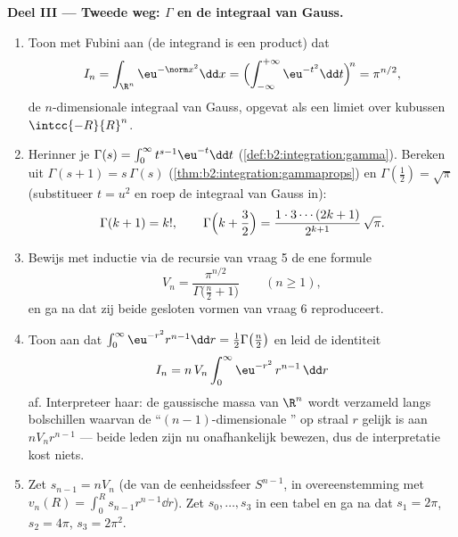\begin{problem}[{Weekendopgave --- $V_n =
\pi^{n/2}/\Gamma(\frac n2 + 1)$, en de vreemdheid van hoge
dimensies}]
\medskip
\noindent\textbf{Deel III --- Tweede weg: $\Gamma$ en de
integraal van Gauss.}
\begin{enumerate}[resume]
  \item Toon met Fubini aan (de integrand is een product) dat
        \[
        I_n = \int_{\R^n}\eu^{-\norm
        x^2}\dd x
        = \Bigl(\int_{-\infty}^{+\infty}
        \eu^{-t^2}\dd t\Bigr)^{\!n} = \pi^{n/2},
        \]
        de $n$-dimensionale integraal van Gauss, opgevat als een
        limiet over kubussen $\intcc{-R}{R}^n$.
  \item Herinner je $\Gamma(s) = \int_0^\infty t^{s-1}\eu^{-t}\dd
        t$ (\cref{def:b2:integration:gamma}). Bereken uit
        $\Gamma(s+1) = s\,\Gamma(s)$
        (\cref{thm:b2:integration:gammaprops}) en
        $\Gamma(\tfrac12) = \sqrt\pi$ (substitueer $t = u^2$ en
        roep de integraal van Gauss in):
        \[
        \Gamma(k + 1) = k!,
        \qquad
        \Gamma\Bigl(k + \frac32\Bigr) =
        \frac{1\cdot3\cdots(2k+1)}{2^{k+1}}\,\sqrt\pi .
        \]
  \item Bewijs met inductie via de recursie van vraag 5 de ene
        formule
        \[
        V_n = \frac{\pi^{n/2}}{\Gamma\bigl(\frac n2 +
        1\bigr)} \qquad (n \geq 1),
        \]
        en ga na dat zij beide gesloten vormen van vraag 6
        reproduceert.
  \item Toon aan dat $\int_0^\infty \eu^{-r^2}r^{n-1}\dd r =
        \tfrac12\Gamma\bigl(\tfrac n2\bigr)$ en leid de identiteit
        \[
        I_n = n\,V_n\int_0^\infty \eu^{-r^2}\,r^{n-1}\,\dd r
        \]
        af. Interpreteer haar: de gaussische massa van $\R^n$ wordt
        verzameld langs bolschillen waarvan de
        ``$(n-1)$-dimensionale '' op straal $r$ gelijk
        is aan $nV_nr^{n-1}$ --- beide leden zijn nu onafhankelijk
        bewezen, dus de interpretatie kost niets.
  \item Zet $s_{n-1} = nV_n$ (de  van de eenheidssfeer
        $S^{n-1}$, in overeenstemming met $v_n(R) = \int_0^R
        s_{n-1}r^{n-1}\dd r$). Zet $s_0, \dots, s_3$ in een tabel
        en ga na dat $s_1 = 2\pi$, $s_2 = 4\pi$, $s_3 = 2\pi^2$.
\end{enumerate}


\end{problem}
